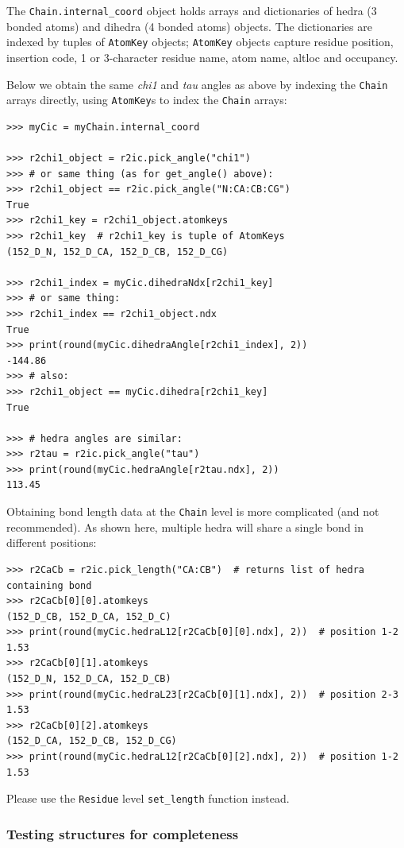 The \texttt{Chain.internal\_coord} object holds arrays and dictionaries of hedra (3
bonded atoms) and dihedra (4 bonded atoms) objects.  The dictionaries are indexed 
by tuples of \texttt{AtomKey} objects; \texttt{AtomKey} objects capture residue position, insertion
code, 1 or 3-character residue name, atom name, altloc and occupancy.  

Below we obtain the same \textit{chi1} and \textit{tau} angles as above by indexing the \texttt{Chain}
arrays directly, using \texttt{AtomKey}s to index the \texttt{Chain} arrays: 

\begin{verbatim}
>>> myCic = myChain.internal_coord

>>> r2chi1_object = r2ic.pick_angle("chi1")
>>> # or same thing (as for get_angle() above):
>>> r2chi1_object == r2ic.pick_angle("N:CA:CB:CG")
True
>>> r2chi1_key = r2chi1_object.atomkeys
>>> r2chi1_key  # r2chi1_key is tuple of AtomKeys
(152_D_N, 152_D_CA, 152_D_CB, 152_D_CG)

>>> r2chi1_index = myCic.dihedraNdx[r2chi1_key]
>>> # or same thing:
>>> r2chi1_index == r2chi1_object.ndx
True
>>> print(round(myCic.dihedraAngle[r2chi1_index], 2))
-144.86
>>> # also:
>>> r2chi1_object == myCic.dihedra[r2chi1_key]
True

>>> # hedra angles are similar:
>>> r2tau = r2ic.pick_angle("tau")
>>> print(round(myCic.hedraAngle[r2tau.ndx], 2))
113.45
\end{verbatim}

Obtaining bond length data at the \texttt{Chain} level is more complicated (and
not recommended).  As shown here, multiple hedra will share a single bond in different
positions:

\begin{verbatim}
>>> r2CaCb = r2ic.pick_length("CA:CB")  # returns list of hedra containing bond
>>> r2CaCb[0][0].atomkeys
(152_D_CB, 152_D_CA, 152_D_C)
>>> print(round(myCic.hedraL12[r2CaCb[0][0].ndx], 2))  # position 1-2
1.53
>>> r2CaCb[0][1].atomkeys
(152_D_N, 152_D_CA, 152_D_CB)
>>> print(round(myCic.hedraL23[r2CaCb[0][1].ndx], 2))  # position 2-3
1.53
>>> r2CaCb[0][2].atomkeys
(152_D_CA, 152_D_CB, 152_D_CG)
>>> print(round(myCic.hedraL12[r2CaCb[0][2].ndx], 2))  # position 1-2
1.53
\end{verbatim}

Please use the \texttt{Residue} level \texttt{set\_length\(\)}
function instead.

\subsubsection{Testing structures for completeness}


